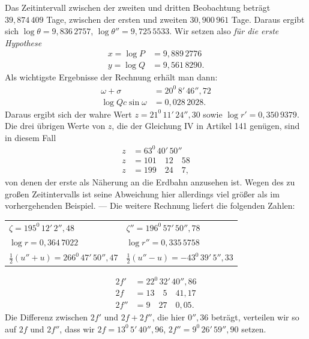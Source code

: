 Das Zeitintervall zwischen der zweiten und dritten Beobachtung beträgt $39{,}874\,409$ Tage, zwischen der ersten und zweiten $30{,}900\,961$ Tage. Daraus ergibt sich $\log\theta=9{,}836\,2757$, $\log\theta''=9{,}725\,5533$. Wir setzen also \textit{für die erste Hypothese}
\[
\begin{aligned}
x=\log P&=9{,}889\,2776\\
y=\log Q&=9{,}561\,8290.
\end{aligned}
\]
\noindent Als wichtigste Ergebnisse der Rechnung erhält man dann:
\[
\begin{aligned}
\omega+\sigma&=20^0\,8'\,46''{,}72\\
\log Qc\sin\omega&=0{,}028\,2028.
\end{aligned}
\]
\noindent Daraus ergibt sich der wahre Wert $z=21^0\,11'\,24''{,}30$ sowie $\log r'=0{,}350\,9379$. Die drei übrigen Werte von $z$, die der Gleichung IV in Artikel 141 genügen, sind in diesem Fall
\[
\begin{aligned}
z&=63^0\,40'\,50''\\
z&=101\quad12\quad58\\
z&=199\quad24\quad7,
\end{aligned}
\]
\noindent{}von denen der erste als Näherung an die Erdbahn anzusehen ist. Wegen des zu großen Zeitintervalls ist seine Abweichung hier allerdings viel größer als im vorhergehenden Beispiel. --- Die weitere Rechnung liefert die folgenden Zahlen:
\begin{center}\begingroup\footnotesize\setlength{\tabcolsep}{6pt}\renewcommand{\arraystretch}{1.3}
\begin{tabular}{ll}
$\zeta=195^0\,12'\,2''{,}48$ & $\zeta''=196^0\,57'\,50''{,}78$\\
$\log r=0{,}364\,7022$ & $\log r''=0{,}335\,5758$\\
$\tfrac12(u''+u)=266^0\,47'\,50''{,}47$ & $\tfrac12(u''-u)=-43^0\,39'\,5''{,}33$
\end{tabular}\endgroup\end{center}
\[
\begin{aligned}
2f'&=22^0\,32'\,40''{,}86\\
2f&=13\quad5\quad41{,}17\\
2f''&=9\quad27\quad0{,}05.
\end{aligned}
\]
\noindent Die Differenz zwischen $2f'$ und $2f+2f''$, die hier $0''{,}36$ beträgt, verteilen wir so auf $2f$ und $2f''$, dass wir $2f=13^0\,5'\,40''{,}96$, $2f''=9^0\,26'\,59''{,}90$ setzen.

